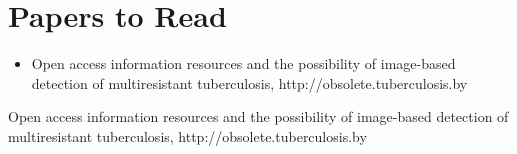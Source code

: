 \documentclass[letterpaper, 12pt]{article}
\begin{document}
\section{Papers to Read}
\begin{itemize}
\item
Open access information resources and the possibility of image-based detection of multiresistant tuberculosis, http://obsolete.tuberculosis.by
\end{itemize}


\begin{thebibliography}{1}
Open access information resources and the possibility of image-based detection of multiresistant tuberculosis, http://obsolete.tuberculosis.by
\end{thebibliography}
\end{document}
